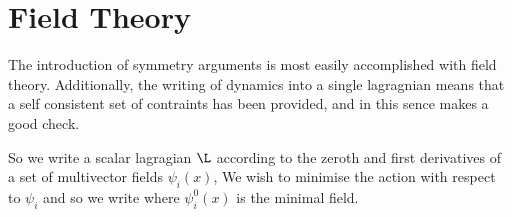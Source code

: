 \section{Field Theory}

The introduction of symmetry arguments is most easily accomplished
with field theory.
Additionally, the writing of dynamics into a single lagragnian means
that a self consistent set of contraints has been provided,
and in this sence makes a good check.

So we write a scalar lagragian $\L$ according to the zeroth and first
derivatives of a set of  multivector fields $\psi_i(x)$,
We wish to minimise the action
with respect to $\psi_i$ and so we write 
where $\psi_i^0(x)$ is the minimal field.

